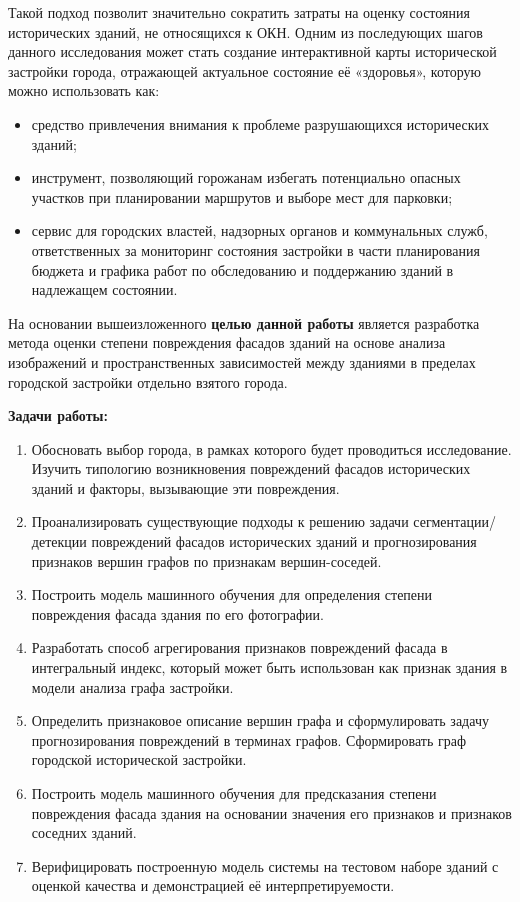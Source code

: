 \documentclass[14pt]{extarticle}
\begin{document}
Такой подход позволит значительно сократить затраты на оценку состояния
исторических зданий, не относящихся к ОКН. Одним из последующих шагов данного
исследования может стать создание интерактивной карты исторической застройки
города, отражающей актуальное состояние её «здоровья», которую можно
использовать как:
\begin{itemize}[leftmargin=*]
    \item средство привлечения внимания к проблеме разрушающихся
          исторических зданий;
    \item инструмент, позволяющий горожанам избегать потенциально опасных
          участков при планировании маршрутов и выборе мест для парковки;
    \item сервис для городских властей, надзорных органов и коммунальных служб,
          ответственных за мониторинг состояния застройки в части планирования
          бюджета и графика работ по обследованию и поддержанию зданий в
          надлежащем состоянии.
\end{itemize}

На основании вышеизложенного \textbf{целью данной работы} является разработка
метода оценки степени повреждения фасадов зданий на основе анализа изображений
и пространственных зависимостей между зданиями в пределах городской застройки
отдельно взятого города.

\noindent\textbf{Задачи работы:}
\begin{enumerate}[leftmargin=*, label=\arabic*.]
 	\item Обосновать выбор города, в рамках которого будет проводиться
	исследование. Изучить типологию возникновения повреждений фасадов
	исторических зданий и факторы, вызывающие эти повреждения.
    \item Проанализировать существующие подходы к решению задачи
          сегментации/детекции повреждений фасадов исторических зданий и
          прогнозирования признаков вершин графов по признакам вершин-соседей.
    \item Построить модель машинного обучения для определения степени
          повреждения фасада здания по его фотографии.
    \item Разработать способ агрегирования признаков повреждений фасада в
          интегральный индекс, который может быть использован как признак здания
          в модели анализа графа застройки.
    \item Определить признаковое описание вершин графа и сформулировать задачу
          прогнозирования повреждений в терминах графов. Сформировать граф
          городской исторической застройки.
    \item Построить модель машинного обучения для предсказания степени
          повреждения фасада здания на основании значения его признаков и
          признаков соседних зданий.
    \item Верифицировать построенную модель системы на тестовом наборе зданий
          с оценкой качества и демонстрацией её интерпретируемости.
\end{enumerate}
\end{document}
